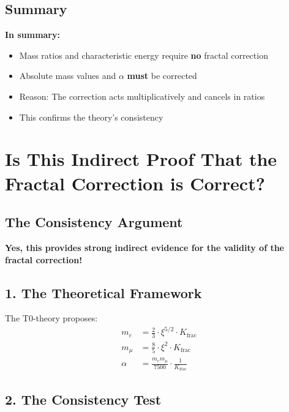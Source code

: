\documentclass[12pt,a4paper]{article}
\theoremstyle{definition}
\begin{document}
\subsection*{Summary}

\begin{tcolorbox}[colback=blue!5!white,colframe=blue!75!black]
	\textbf{In summary:}
	\begin{itemize}
		\item Mass ratios and characteristic energy require \textbf{no} fractal correction
		\item Absolute mass values and $\alpha$ \textbf{must} be corrected
		\item Reason: The correction acts multiplicatively and cancels in ratios
		\item This confirms the theory's consistency
	\end{itemize}
\end{tcolorbox}



\section*{Is This Indirect Proof That the Fractal Correction is Correct?}

\subsection*{The Consistency Argument}

\begin{tcolorbox}[colback=green!5!white,colframe=green!75!black]
	\textbf{Yes, this provides strong indirect evidence for the validity of the fractal correction!}
\end{tcolorbox}

\subsection*{1. The Theoretical Framework}

The T0-theory proposes:
\begin{align*}
	m_e &= \frac{2}{3} \cdot \xi^{5/2} \cdot K_{\text{frac}} \\
	m_\mu &= \frac{8}{5} \cdot \xi^2 \cdot K_{\text{frac}} \\
	\alpha &= \frac{m_e m_\mu}{7500} \cdot \frac{1}{K_{\text{frac}}}
\end{align*}

\subsection*{2. The Consistency Test}
\end{document}
